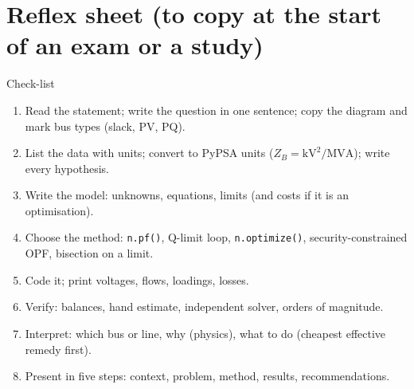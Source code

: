\documentclass[11pt,a4paper]{article}
\begin{document}
\section{Reflex sheet (to copy at the start of an exam or a study)}
\begin{gbox}{Check-list}
\begin{enumerate}
\item Read the statement; write the question in one sentence; copy the diagram and mark bus types (slack, PV, PQ).
\item List the data with units; convert to PyPSA units ($Z_B = \text{kV}^2/\text{MVA}$); write every hypothesis.
\item Write the model: unknowns, equations, limits (and costs if it is an optimisation).
\item Choose the method: \texttt{n.pf()}, Q-limit loop, \texttt{n.optimize()}, security-constrained OPF, bisection on a limit.
\item Code it; print voltages, flows, loadings, losses.
\item Verify: balances, hand estimate, independent solver, orders of magnitude.
\item Interpret: which bus or line, why (physics), what to do (cheapest effective remedy first).
\item Present in five steps: context, problem, method, results, recommendations.
\end{enumerate}
\end{gbox}
\end{document}
